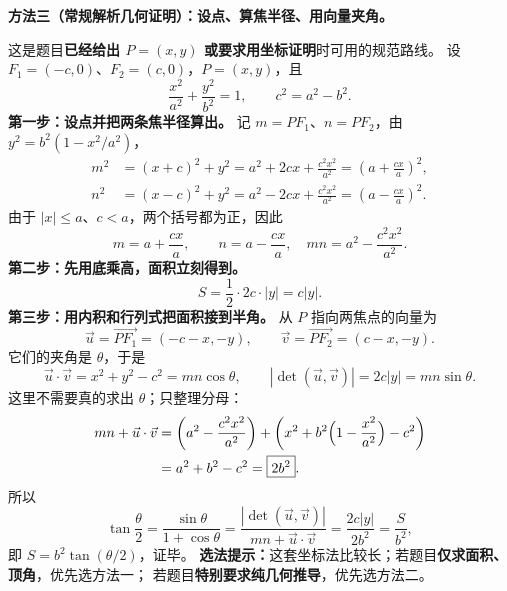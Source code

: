 \begin{proofbox}
\textbf{方法三（常规解析几何证明）：设点、算焦半径、用向量夹角。}

这是题目\textbf{已经给出 $P=(x,y)$ 或要求用坐标证明}时可用的规范路线。
设 $F_1=(-c,0)$、$F_2=(c,0)$，$P=(x,y)$，且
\[
 \frac{x^2}{a^2}+\frac{y^2}{b^2}=1,
 \qquad c^2=a^2-b^2.
\]
\textbf{第一步：设点并把两条焦半径算出。}
记 $m=PF_1$、$n=PF_2$，由 $y^2=b^2(1-x^2/a^2)$，
\[
 \begin{aligned}
 m^2&=(x+c)^2+y^2
      =a^2+2cx+\frac{c^2x^2}{a^2}
      =\left(a+\frac{cx}{a}\right)^2,\\
 n^2&=(x-c)^2+y^2
      =a^2-2cx+\frac{c^2x^2}{a^2}
      =\left(a-\frac{cx}{a}\right)^2.
 \end{aligned}
\]
由于 $|x|\le a$、$c<a$，两个括号都为正，因此
\[
 \boxed{m=a+\frac{cx}{a},\qquad n=a-\frac{cx}{a}},
 \quad mn=a^2-\frac{c^2x^2}{a^2}.
\]
\textbf{第二步：先用底乘高，面积立刻得到。}
\[
 \boxed{S=\frac12\cdot2c\cdot|y|=c|y|}.
\]
\textbf{第三步：用内积和行列式把面积接到半角。}
从 $P$ 指向两焦点的向量为
\[
 \vec u=\overrightarrow{PF_1}=(-c-x,-y),\qquad
 \vec v=\overrightarrow{PF_2}=(c-x,-y).
\]
它们的夹角是 $\theta$，于是
\[
 \vec u\cdot\vec v=x^2+y^2-c^2=mn\cos\theta,
 \qquad |\det(\vec u,\vec v)|=2c|y|=mn\sin\theta.
\]
这里不需要真的求出 $\theta$；只整理分母：
\[
 \begin{aligned}
 mn+\vec u\cdot\vec v
 &=\left(a^2-\frac{c^2x^2}{a^2}\right)
   +\left(x^2+b^2\Bigl(1-\frac{x^2}{a^2}\Bigr)-c^2\right)\\
 &=a^2+b^2-c^2=\boxed{2b^2}.
 \end{aligned}
\]
所以
\[
 \tan\frac\theta2
 =\frac{\sin\theta}{1+\cos\theta}
 =\frac{|\det(\vec u,\vec v)|}{mn+\vec u\cdot\vec v}
 =\frac{2c|y|}{2b^2}=\frac{S}{b^2},
\]
即 $\boxed{S=b^2\tan(\theta/2)}$，证毕。
\textbf{选法提示：}这套坐标法比较长；若题目\textbf{仅求面积、顶角}，优先选方法一；
若题目\textbf{特别要求纯几何推导}，优先选方法二。
\end{proofbox}
\clearpage

